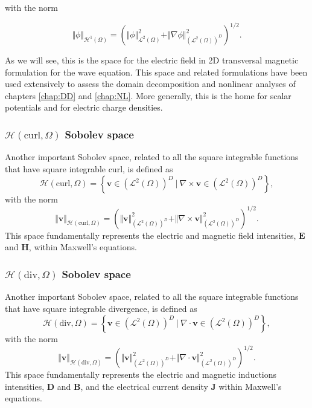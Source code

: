 \noindent with the norm

$$\Vert\phi\Vert_{\mathcal{H}^1(\Omega)} = \left( \Vert\phi\Vert_{\mathcal{L}^2(\Omega)}^2 + \Vert\nabla \phi\Vert_{(\mathcal{L}^2(\Omega))^D}^2 \right)^{1/2}.$$

\noindent As we will see, this is the  space for the electric field in 2D transversal magnetic formulation for the wave equation. This space and related formulations have been used extensively to assess the domain decomposition and nonlinear analyses of chapters \ref{chap:DD} and \ref{chap:NL}. More generally, this is the home for scalar potentials and for electric charge densities.

\subsubsection{\texorpdfstring{$\mathcal{H}(\mathrm{curl},\Omega)$ Sobolev space}{Hcurl Sobolev space}}

Another important Sobolev space, related to all the square integrable functions that have square integrable curl, is defined as
%
$$\mathcal{H}(\mathrm{curl},\Omega) = \left \lbrace \mathbf{v} \in (\mathcal{L}^2(\Omega))^D \ | \ \nabla  \times \mathbf{v} \in (\mathcal{L}^2(\Omega))^D \right\rbrace,$$
%
\noindent with the norm
%
$$\Vert\mathbf{v}\Vert_{\mathcal{H}(\mathrm{curl},\Omega)} = \left( \Vert \mathbf{v} \Vert_{(\mathcal{L}^2(\Omega))^D}^2 + \Vert\nabla \times \mathbf{v} \Vert_{(\mathcal{L}^2(\Omega))^D}^2 \right)^{1/2}.$$
%
\noindent This space fundamentally represents the electric and magnetic field intensities, $\mathbf{E}$ and $\mathbf{H}$, within Maxwell's equations.
%
\subsubsection{\texorpdfstring{$\mathcal{H}(\mathrm{div},\Omega)$ Sobolev space}{Hdiv Sobolev space}}
%
Another important Sobolev space, related to all the square integrable functions that have square integrable divergence, is defined as
%
$$\mathcal{H}(\mathrm{div},\Omega) = \left\lbrace \mathbf{v} \in (\mathcal{L}^2(\Omega))^D \ | \ \nabla  \cdot \mathbf{v} \in (\mathcal{L}^2(\Omega))^D \right\rbrace,$$
%
\noindent with the norm
%
$$\Vert\mathbf{v}\Vert_{\mathcal{H}(\mathrm{div},\Omega)} = \left( \Vert \mathbf{v} \Vert_{(\mathcal{L}^2(\Omega))^D}^2 + \Vert\nabla \cdot \mathbf{v} \Vert_{(\mathcal{L}^2(\Omega))^D}^2 \right)^{1/2}.$$
%
\noindent This space fundamentally represents the electric and magnetic inductions intensities, $\mathbf{D}$ and $\mathbf{B}$, and the electrical current density $\mathbf{J}$ within Maxwell's equations.
%
